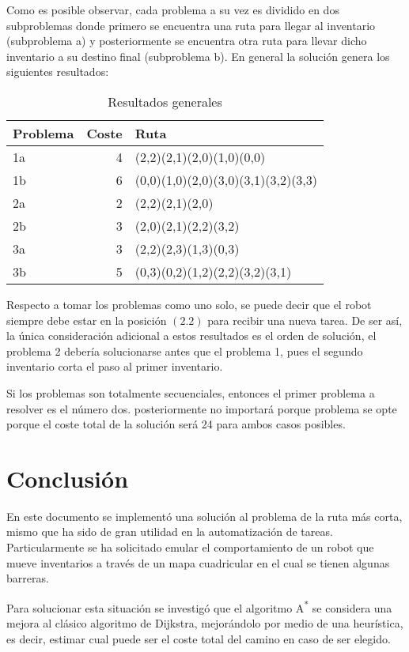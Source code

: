 \documentclass[a4paper,12pt]{article}
\begin{document}
Como es posible observar, cada problema a su vez es dividido en dos subproblemas donde primero se encuentra una ruta para llegar al inventario (subproblema a) y posteriormente se encuentra otra ruta para llevar dicho inventario a su destino final (subproblema b). En general la solución genera los siguientes resultados:

\begin{table}[htbp]
\caption{Resultados generales}
\centering
\begin{tabular}{lrl}
\hline
Problema & Coste & Ruta\\
\hline
1a & 4 & (2,2)(2,1)(2,0)(1,0)(0,0)\\
1b & 6 & (0,0)(1,0)(2,0)(3,0)(3,1)(3,2)(3,3)\\
2a & 2 & (2,2)(2,1)(2,0)\\
2b & 3 & (2,0)(2,1)(2,2)(3,2)\\
3a & 3 & (2,2)(2,3)(1,3)(0,3)\\
3b & 5 & (0,3)(0,2)(1,2)(2,2)(3,2)(3,1)\\
\hline
\end{tabular}
\end{table}

Respecto a tomar los problemas como uno solo, se puede decir que el robot siempre debe estar en la posición \((2 . 2)\) para recibir una nueva tarea. De ser así, la única consideración adicional a estos resultados es el orden de solución, el problema 2 debería solucionarse antes que el problema 1, pues el segundo inventario corta el paso al primer inventario.

Si los problemas son totalmente secuenciales, entonces el primer problema a resolver es el número dos. posteriormente no importará porque problema se opte porque el coste total de la solución será 24 para ambos casos posibles.

\section*{Conclusión}
\label{sec:org5b925bd}

En este documento se implementó una solución al problema de la ruta más corta, mismo que ha sido de gran utilidad en la automatización de tareas. Particularmente se ha solicitado emular el comportamiento de un robot que mueve inventarios a través de un mapa cuadricular en el cual se tienen algunas barreras.

Para solucionar esta situación se investigó que el algoritmo A\textsuperscript{*} se considera una mejora al clásico algoritmo de Dijkstra, mejorándolo por medio de una heurística, es decir, estimar cual puede ser el coste total del camino en caso de ser elegido.
\end{document}
